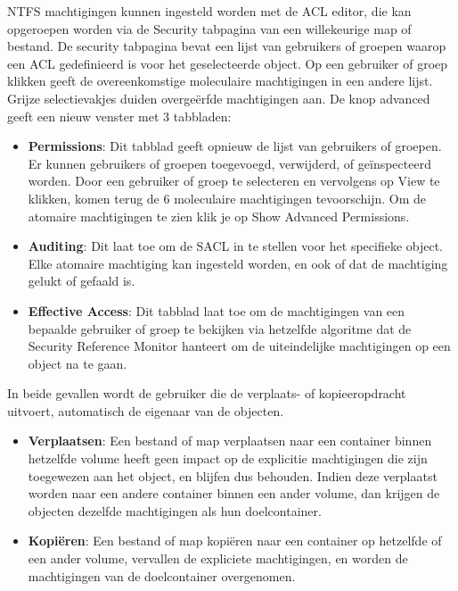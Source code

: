 \begin{enumerate}
{				NTFS machtigingen kunnen ingesteld worden met de ACL editor, die kan opgeroepen worden via de Security tabpagina van een willekeurige map of bestand. De security tabpagina bevat een lijst van gebruikers of groepen waarop een ACL gedefinieerd is voor het geselecteerde object. Op een gebruiker of groep klikken geeft de overeenkomstige moleculaire machtigingen in een andere lijst. Grijze selectievakjes duiden overgeërfde machtigingen aan. De knop advanced geeft een nieuw venster met 3 tabbladen:
				\begin{itemize}
					\item \textbf{Permissions}: Dit tabblad geeft opnieuw de lijst van gebruikers of groepen. Er kunnen gebruikers of groepen toegevoegd, verwijderd, of geïnspecteerd worden. Door een gebruiker of groep te selecteren en vervolgens op View te klikken, komen terug de 6 moleculaire machtigingen tevoorschijn. Om de atomaire machtigingen te zien klik je op Show Advanced Permissions.
					\item \textbf{Auditing}: Dit laat toe om de SACL in te stellen voor het specifieke object. Elke atomaire machtiging kan ingesteld worden, en ook of dat de machtiging gelukt of gefaald is.
					\item \textbf{Effective Access}: Dit tabblad laat toe om de machtigingen van een bepaalde gebruiker of groep te bekijken via hetzelfde algoritme dat de Security Reference Monitor hanteert om de uiteindelijke machtigingen op een object na te gaan.
				\end{itemize} 
		}
		
		 { 
			In beide gevallen wordt de gebruiker die de verplaats- of kopieeropdracht uitvoert, automatisch de eigenaar van de objecten. 
			\begin{itemize}
				\item \textbf{Verplaatsen}: Een bestand of map verplaatsen naar een container binnen hetzelfde volume heeft geen impact op de explicitie machtigingen die zijn toegewezen aan het object, en blijfen dus behouden. Indien deze verplaatst worden naar een andere container binnen een ander volume, dan krijgen de objecten dezelfde machtigingen als hun doelcontainer.
				\item \textbf{Kopiëren}: Een bestand of map kopiëren naar een container op hetzelfde of een ander volume, vervallen de expliciete machtigingen, en worden de machtigingen van de doelcontainer overgenomen.
			\end{itemize}
		}
		

\end{enumerate}
